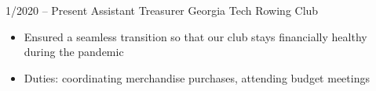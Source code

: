 \documentclass[9pt]{developercv} %
\begin{document}


\begin{entrylist}
	\entry
		{1/2020 -- Present}
		{Assistant Treasurer}
		{Georgia Tech Rowing Club}
		{\vspace{-\baselineskip}\begin{itemize}
			\item Ensured a seamless transition so that our club stays financially healthy during the pandemic
			\item Duties: coordinating merchandise purchases, attending budget meetings
		\end{itemize}}
\end{entrylist}

\end{document}

